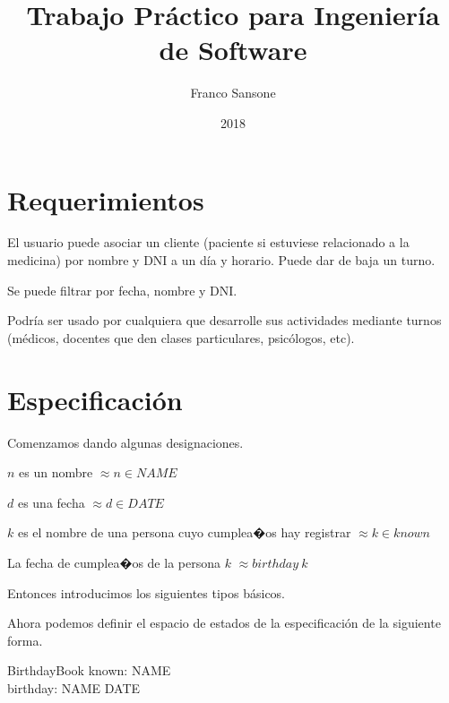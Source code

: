 \documentclass[a4paper,twoside]{article}
\title{Trabajo Práctico para Ingeniería de Software}
\author{Franco Sansone}
\date{2018}
\newcommand{\desig}[2]{\item #1 $\approx #2$}
\begin{document}
  \thispagestyle{empty}
  \maketitle

  \section{Requerimientos}
  El usuario puede asociar un cliente (paciente si estuviese relacionado a la medicina) por nombre y DNI a un día y horario. Puede dar de baja un turno.

  Se puede filtrar por fecha, nombre y DNI.

  Podría ser usado por cualquiera que desarrolle sus actividades mediante turnos (médicos, docentes que den clases particulares, psicólogos, etc).

  \section{Especificación}
  Comenzamos dando algunas designaciones.

  \begin{zed}
  \desig{$n$ es un nombre}{n \in NAME}
  \desig{$d$ es una fecha}{d \in DATE}
  \desig{$k$ es el nombre de una persona cuyo cumplea�os hay registrar}{k \in known}
  \desig{La fecha de cumplea�os de la persona $k$}{birthday~k}
  \end{zed}

  Entonces introducimos los siguientes tipos básicos.

  \begin{zed}
  \end{zed}

  Ahora podemos definir el espacio de estados de la especificación de la siguiente forma.

  \begin{schema}{BirthdayBook}
  known: \power NAME \\
  birthday: NAME \pfun DATE
  \end{schema}
\end{document}
